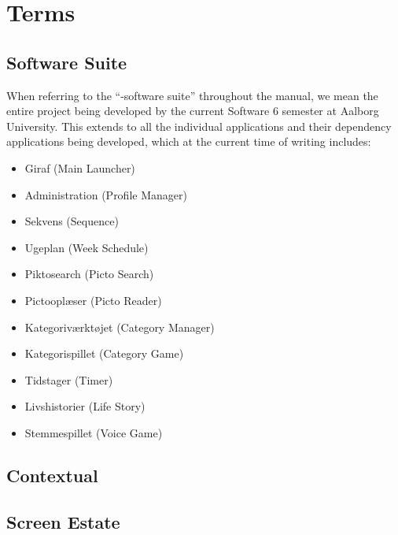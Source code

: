 
\chapter{Terms}

\section{\giraf Software Suite}
\noindent When referring to the ``\giraf-software suite'' throughout the manual, we mean the entire \giraf project being developed by the current Software 6 semester at Aalborg University. This extends to all the individual applications and their dependency applications being developed, which at the current time of writing includes: 

\begin{itemize}
    \item Giraf (Main Launcher)
    \item Administration (Profile Manager)
    \item Sekvens (Sequence)
    \item Ugeplan (Week Schedule)
    \item Piktosearch (Picto Search)
    \item Pictooplæser (Picto Reader)
    \item Kategoriværktøjet (Category Manager)
    \item Kategorispillet (Category Game)
    \item Tidstager (Timer)
    \item Livshistorier (Life Story)
    \item Stemmespillet (Voice Game)
\end{itemize}

\section{Contextual}


\section{Screen Estate}
